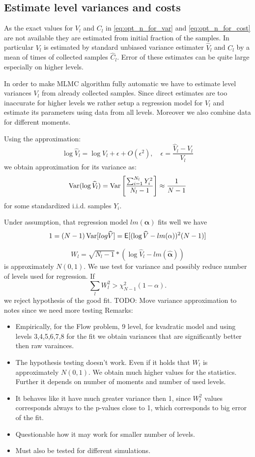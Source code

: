 \documentclass{article}
\def\vc#1{\mathbf{\boldsymbol{#1}}}     %
\def \E{{\mathsf E}}
\def\todo#1{{\color{red}TODO: #1}}
\def\Var{\mathop{\rm Var}}
\begin{document}
\subsection{Estimate level variances and costs}
\label{sec:VarEst}
As the exact values for $V_l$ and $C_l$ in \eqref{eq:opt_n_for_var} and \eqref{eq:opt_n_for_cost} are not available they are estimated from initial fraction of the samples. In particular $V_l$ is estimated by standard unbiased variance estimater $\widehat V_l$ and $C_l$ by a mean of times of collected samples 
$\widehat C_l$. Error of these estimates can be quite large especially on higher levels. 



In order to make MLMC algorithm fully automatic we have to estimate level variances $V_l$ from already collected samples. Since direct estimates are too inaccurate for higher levels we rather setup a regression model for $V_l$ and estimate its parameters using data from all levels. Moreover we also combine data for different moments.


Using the approximation:
\[
 \log \widehat V_l = \log V_l + \epsilon + O(\epsilon^2), \quad \epsilon = \frac{\widehat V_l - V_l}{V_l}
\]
we obtain approximation for its variance as:
\[
   \Var(\log \widehat V_l) = \Var\left[ \frac{\sum_{i=1}^{N_l} Y_i^2}{N_l -1}\right]  \approx \frac{1}{N-1}
\]
for some standardized i.i.d. samples $Y_i$.

Under assumption, that regression model $lm(\vc \alpha)$ fits well we have 
\[
 1 = (N-1) \Var[log \widehat V] = \E[ (\log \widehat V - lm(\alpha))^2 (N-1) ] 
\]


\[
  W_l = \sqrt{N_l-1}*(\log \widehat V_l - lm(\widehat{\vc\alpha}))
\]  
  is approximately $N(0,1)$. We use test for variance and possibly 
reduce number of levels used for regression. If
\[
  \sum_l W_l^2 > \chi^2_{N-1}(1-\alpha). 
\]
we reject hypothesis of the good fit.
\todo{Move variance approximation to notes since we need more testing}
Remarks:
\begin{itemize}
 \item Empirically, for the Flow problem, 9 level, for kvadratic model and using levels 3,4,5,6,7,8 for the fit we obtain variances that are significantly better then raw varainces.
 \item The hypothesis testing doesn't work. Even if it holds that $W_l$ is approximately $N(0,1)$.
 We obtain much higher values for the statistics. Further it depends on number of moments and number of used levels. 
 \item It behaves like it have much greater variance then 1, since $W_l^2$ values corresponds always to the p-values close to 1, which corresponds to big error of the fit.
 \item Questionable how it may work for smaller number of levels.
 \item Must also be tested for different simulations.
\end{itemize}
\end{document}
